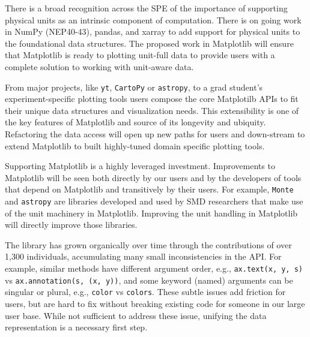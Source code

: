 \documentclass[12pt]{article}
\numberwithin{page}{section}
\begin{document}
There is a broad recognition across the SPE of the importance of
supporting physical units as an intrinsic component of computation.
There is on going work in NumPy (NEP40-43), pandas, and xarray to add
support for physical units to the foundational data structures.  The
proposed work in Matplotlib will ensure that Matplotlib is ready to
plotting unit-full data to provide users with a complete solution to
working with unit-aware data.

From major projects, like \texttt{yt}, \texttt{CartoPy} or
\texttt{astropy}, to a grad student's experiment-specific plotting
tools users compose the core Matplotilb APIs to fit their unique data
structures and visualization needs.  This extensibility is one of the
key features of Matplotlib and source of its longevity and ubiquity.
Refactoring the data access will open up new paths for users and
down-stream to extend Matplotlib to built highly-tuned domain specific
plotting tools.

Supporting Matplotlib is a highly leveraged investment.  Improvements
to Matplotlib will be seen both directly by our users and by the
developers of tools that depend on Matplotlib and transitively by
their users.  For example, \texttt{Monte} and
\texttt{astropy} are libraries developed and used by SMD researchers
that make use of the unit machinery in Matplotlib.   Improving the
unit handling in Matplotlib will directly improve those libraries.

The library has grown organically over time through the contributions
of over 1,300 individuals, accumulating many small inconsistencies in
the API.  For example, similar methods have different argument order,
e.g., \texttt{ax.text(x, y, s)} vs \texttt{ax.annotation(s, (x, y))},
and some keyword (named) arguments can be singular or plural, e.g.,
\texttt{color} vs \texttt{colors}.  These subtle issues add friction
for users, but are hard to fix without breaking existing code for
someone in our large user base.  While not sufficient to address these
issue, unifying the data representation is a necessary first step.


%
\end{document}
